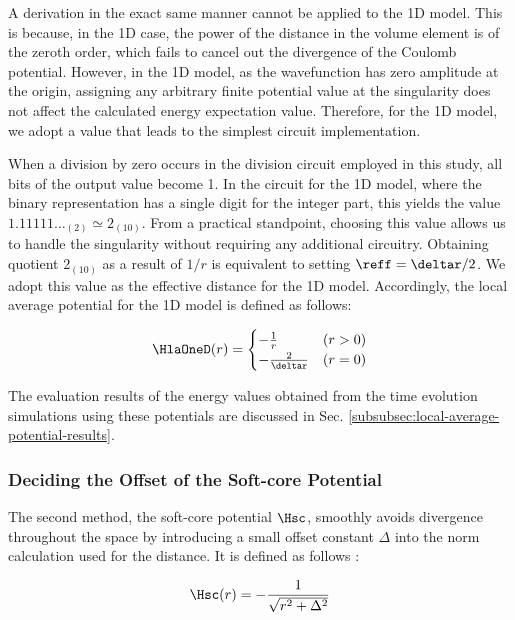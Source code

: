 \documentclass[manuscript_main.tex]{subfiles}
\begin{document}
A derivation in the exact same manner cannot be applied to the 1D model. This is
because, in the 1D case, the power of the distance in the volume element is of
the zeroth order, which fails to cancel out the divergence of the Coulomb
potential. However, in the 1D model, as the wavefunction has zero amplitude at
the origin, assigning any arbitrary finite potential value at the singularity
does not affect the calculated energy expectation value. Therefore, for the 1D
model, we adopt a value that leads to the simplest circuit implementation.

When a division by zero occurs in the division circuit employed in this study,
all bits of the output value become 1. In the circuit for the 1D model, where
the binary representation has a single digit for the integer part, this yields
the value $1.11111\dots_{(2)} \simeq 2_{(10)}$. From a practical standpoint,
choosing this value allows us to handle the singularity without requiring any
additional circuitry. Obtaining quotient $2_{(10)}$ as a result of $1/r$ is
equivalent to setting $\reff = \deltar/2$. We adopt this value as the effective
distance for the 1D model. Accordingly, the local average potential for the 1D
model is defined as follows:

\begin{equation}
\HlaOneD(r) = \begin{cases}
-\frac{1}{r} & (r>0) \\
-\frac{2}{\deltar} & (r=0)
\end{cases}
\label{eq:Hlar1d-fixed}
\end{equation}

The evaluation results of the energy values obtained from the time evolution
simulations using these potentials are discussed in Sec.
\ref{subsubsec:local-average-potential-results}.

\subsubsection{Deciding the Offset of the Soft-core Potential}
\label{subsubsec:deciding-offset-of-soft-core-potential}

The second method, the soft-core potential $\Hsc$, smoothly avoids divergence
throughout the space by introducing a small offset constant $\Delta$ into the
norm calculation used for the distance. It is defined as follows
\cite{Kivlichan_2017}:

\begin{equation}
\Hsc(r) = -\frac{1}{\sqrt{r^2+\Delta^2}}
\label{eq:Hsc2r}
\end{equation}
\end{document}
